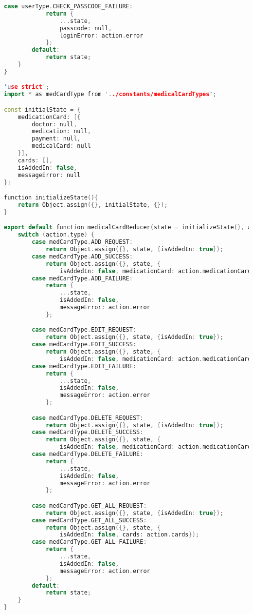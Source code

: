 \begin{lstlisting}[language=C++, style=cplusplusstyle]
        case userType.CHECK_PASSCODE_FAILURE:
            return {
                ...state,
                passcode: null,
                loginError: action.error
            };
        default:
            return state;
    }
}

'use strict';
import * as medCardType from '../constants/medicalCardTypes';

const initialState = {
    medicationCard: [{
        doctor: null,
        medication: null,
        payment: null,
        medicalCard: null
    }],
    cards: [],
    isAddedIn: false,
    messageError: null
};

function initializeState(){
    return Object.assign({}, initialState, {});
}

export default function medicalCardReducer(state = initializeState(), action = {}) {
    switch (action.type) {
        case medCardType.ADD_REQUEST:
            return Object.assign({}, state, {isAddedIn: true});
        case medCardType.ADD_SUCCESS:
            return Object.assign({}, state, {
                isAddedIn: false, medicationCard: action.medicationCard});
        case medCardType.ADD_FAILURE:
            return {
                ...state,
                isAddedIn: false,
                messageError: action.error
            };

        case medCardType.EDIT_REQUEST:
            return Object.assign({}, state, {isAddedIn: true});
        case medCardType.EDIT_SUCCESS:
            return Object.assign({}, state, {
                isAddedIn: false, medicationCard: action.medicationCard});
        case medCardType.EDIT_FAILURE:
            return {
                ...state,
                isAddedIn: false,
                messageError: action.error
            };

        case medCardType.DELETE_REQUEST:
            return Object.assign({}, state, {isAddedIn: true});
        case medCardType.DELETE_SUCCESS:
            return Object.assign({}, state, {
                isAddedIn: false, medicationCard: action.medicationCard});
        case medCardType.DELETE_FAILURE:
            return {
                ...state,
                isAddedIn: false,
                messageError: action.error
            };

        case medCardType.GET_ALL_REQUEST:
            return Object.assign({}, state, {isAddedIn: true});
        case medCardType.GET_ALL_SUCCESS:
            return Object.assign({}, state, {
                isAddedIn: false, cards: action.cards});
        case medCardType.GET_ALL_FAILURE:
            return {
                ...state,
                isAddedIn: false,
                messageError: action.error
            };
        default:
            return state;
    }
}


\end{lstlisting}
